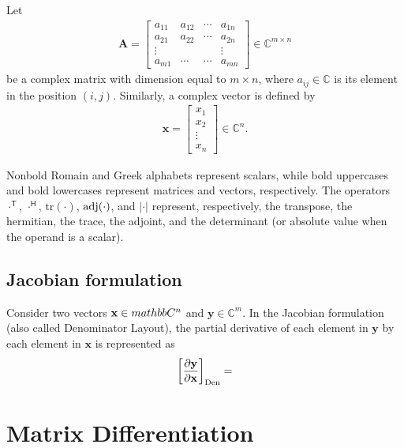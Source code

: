 \documentclass{article}
\newcommand{\trans}{\mathsf{T}}
\newcommand{\hermit}{\mathsf{H}}
\newcommand\abs[1]{\left\lvert#1\right\rvert}
\begin{document}
Let
\begin{align}
    \mathbf{A} = \begin{bmatrix}
        a_{11} & a_{12} & \cdots & a_{1n} \\
        a_{21} & a_{22} & \cdots & a_{2n} \\
        \vdots &        &        & \vdots \\
        a_{m1} & \cdots & \cdots & a_{mn}
    \end{bmatrix} \in \mathbb{C}^{m \times n}
\end{align}
be a complex matrix with dimension equal to \(m \times n\), where \(a_{ij} \in \mathbb{C}\) is its element in the position \((i,j)\). Similarly, a complex vector is defined by
\begin{align}
    \mathbf{x} = \begin{bmatrix}
        x_1 \\
        x_2 \\
        \vdots \\
        x_n
    \end{bmatrix}  \in \mathbb{C}^{n}.
\end{align}

Nonbold Romain and Greek alphabets represent scalars, while bold uppercases and bold lowercases represent matrices and vectors, respectively. The operators \(\cdot^{\trans}\), \(\cdot^{\hermit}\), \(\text{tr}(\cdot)\), \(\textnormal{adj}(\cdot)\), and \(\abs{\cdot}\) represent, respectively, the transpose, the hermitian, the trace, the adjoint, and the determinant (or absolute value when the operand is a scalar).

\subsection{Jacobian formulation}

Consider two vectors \(\mathbf{x} \in \\mathbb{C}^n\) and \(\mathbf{y} \in \mathbb{C}^m\). In the Jacobian formulation (also called Denominator Layout), the partial derivative of each element in \(\mathbf{y}\) by each element in \(\mathbf{x}\) is represented as
\begin{align}
    \left[ \frac{\partial \mathbf{y}}{\partial \mathbf{x}} \right]_{\textnormal{Den}} = 
\end{align}

\section{Matrix Differentiation}

\nocite{*}
\printbibliography[notcategory=cited] %
\end{document}
